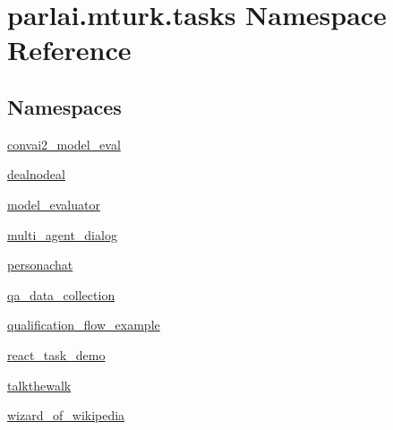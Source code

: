 \hypertarget{namespaceparlai_1_1mturk_1_1tasks}{}\section{parlai.\+mturk.\+tasks Namespace Reference}
\label{namespaceparlai_1_1mturk_1_1tasks}
\subsection*{Namespaces}
\begin{DoxyCompactItemize}
\item 
 \hyperlink{namespaceparlai_1_1mturk_1_1tasks_1_1convai2__model__eval}{convai2\+\_\+model\+\_\+eval}
\item 
 \hyperlink{namespaceparlai_1_1mturk_1_1tasks_1_1dealnodeal}{dealnodeal}
\item 
 \hyperlink{namespaceparlai_1_1mturk_1_1tasks_1_1model__evaluator}{model\+\_\+evaluator}
\item 
 \hyperlink{namespaceparlai_1_1mturk_1_1tasks_1_1multi__agent__dialog}{multi\+\_\+agent\+\_\+dialog}
\item 
 \hyperlink{namespaceparlai_1_1mturk_1_1tasks_1_1personachat}{personachat}
\item 
 \hyperlink{namespaceparlai_1_1mturk_1_1tasks_1_1qa__data__collection}{qa\+\_\+data\+\_\+collection}
\item 
 \hyperlink{namespaceparlai_1_1mturk_1_1tasks_1_1qualification__flow__example}{qualification\+\_\+flow\+\_\+example}
\item 
 \hyperlink{namespaceparlai_1_1mturk_1_1tasks_1_1react__task__demo}{react\+\_\+task\+\_\+demo}
\item 
 \hyperlink{namespaceparlai_1_1mturk_1_1tasks_1_1talkthewalk}{talkthewalk}
\item 
 \hyperlink{namespaceparlai_1_1mturk_1_1tasks_1_1wizard__of__wikipedia}{wizard\+\_\+of\+\_\+wikipedia}
\end{DoxyCompactItemize}
